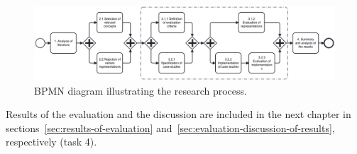 \begin{figure}
    \centering
    \includegraphics[width=\textwidth]{./3-research-methodology/research-process}
    \caption{BPMN diagram illustrating the research process.}
    \label{fig:research-process}
\end{figure}

Results of the evaluation and the discussion are included in the next chapter in sections~\ref{sec:results-of-evaluation} and~\ref{sec:evaluation-discussion-of-results}, respectively (task 4).

